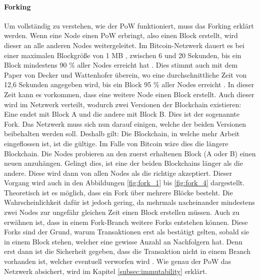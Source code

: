 \paragraph{Forking}
Um vollständig zu verstehen, wie der \acs{PoW} funktioniert, muss das Forking erklärt werden. Wenn eine Node einen \acs{PoW} erbringt, also einen Block erstellt, wird dieser an alle anderen Nodes weitergeleitet. Im Bitcoin-Netzwerk dauert es bei einer maximalen Blockgröße von 1 MB \cite{SchererPerformanceScalabilityBlockchain2017}, zwischen 6 und 20 Sekunden, bis ein Block mindestens 90 \% aller Nodes erreicht hat \cite{BitcoinStatsBitcoinPropagationData}. Dies stimmt auch mit dem Paper von Decker und Wattenhofer überein, wo eine durchschnittliche Zeit von 12,6 Sekunden angegeben wird, bis ein Block 95 \% aller Nodes erreicht \cite{DeckerInformationpropagationbitcoin2013}. In dieser Zeit kann es vorkommen, dass eine weitere Node einen Block erstellt. Auch dieser wird im Netzwerk verteilt, wodurch zwei Versionen der Blockchain existieren: Eine endet mit Block A und die andere mit Block B. Dies ist der sogenannte Fork. Das Netzwerk muss sich nun darauf einigen, welche der beiden Versionen beibehalten werden soll. Deshalb gilt: Die Blockchain, in welche mehr Arbeit eingeflossen ist, ist die gültige. Im Falle von Bitcoin wäre dies die längere Blockchain. Die Nodes probieren an den zuerst erhaltenen Block (A oder B) einen neuen anzuhängen. Gelingt dies, ist eine der beiden Blockchains länger als die andere. Diese wird dann von allen Nodes als die richtige akzeptiert. Dieser Vorgang wird auch in den Abbildungen \ref{fig:fork_1} bis \ref{fig:fork_4} dargestellt. Theoretisch ist es möglich, dass ein Fork über mehrere Blöcke besteht. Die Wahrscheinlichkeit dafür ist jedoch gering, da mehrmals nacheinander mindestens zwei Nodes zur ungefähr gleichen Zeit einen Block erstellen müssen. Auch zu erwähnen ist, dass in einem Fork-Branch weitere Forks entstehen können. Diese Forks sind der Grund, warum Transaktionen erst als bestätigt gelten, sobald sie in einem Block stehen, welcher eine gewisse Anzahl an Nachfolgern hat. Denn erst dann ist die Sicherheit gegeben, dass die Transaktion nicht in einem Branch vorhanden ist, welcher eventuell verworfen wird \cite[S.~211 ff.]{AntonopoulosMasteringbitcoin2015}. Wie genau der \acs{PoW} das Netzwerk absichert, wird im Kapitel \ref{subsec:immutability} erklärt.

